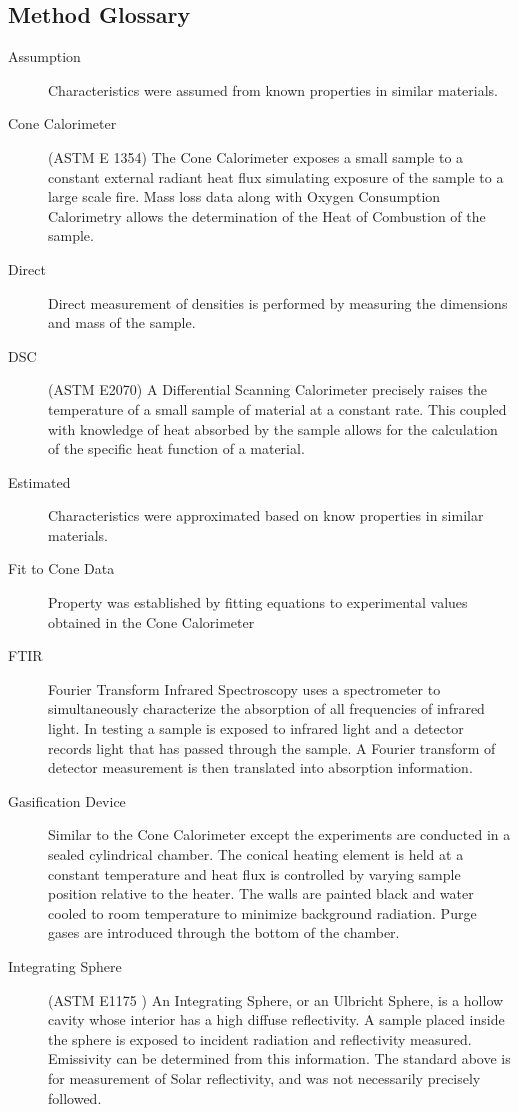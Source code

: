 \subsection{Method Glossary}
\begin{description}
\item[Assumption]  Characteristics were assumed from known properties in similar materials.
\item[Cone Calorimeter] (ASTM E 1354) The Cone Calorimeter exposes a small sample to a constant external radiant heat flux simulating exposure of the sample to a large scale fire. Mass loss data along with Oxygen Consumption Calorimetry allows the determination of the Heat of Combustion of the sample. 
\item[Direct]  Direct measurement of densities is performed by measuring the dimensions and mass of the sample.
\item[DSC] (ASTM E2070) A Differential Scanning Calorimeter precisely raises the temperature of a small sample of material at a constant rate. This coupled with knowledge of heat absorbed by the sample allows for the calculation of the specific heat function of a material.
\item[Estimated] Characteristics were approximated based on know properties in similar materials.
\item[Fit to Cone Data] Property was established by fitting  equations to experimental values obtained in the Cone Calorimeter
\item[FTIR] Fourier Transform Infrared Spectroscopy uses a spectrometer to simultaneously characterize the absorption of all frequencies of infrared light. In testing a sample is exposed to infrared light and a detector records light that has passed through the sample. A Fourier transform of detector measurement is then translated into absorption information.
\item[Gasification Device] Similar to the Cone Calorimeter except the experiments are conducted in a sealed cylindrical chamber. The conical heating element is held at a constant temperature and heat flux is controlled by varying sample position relative to the heater. The walls are painted black and water cooled to room temperature to minimize background radiation. Purge gases are introduced through the bottom of the chamber.
\item[Integrating Sphere] (ASTM E1175 ) An Integrating Sphere, or an Ulbricht Sphere, is a hollow cavity whose interior has a high diffuse reflectivity. A sample placed inside the sphere is exposed to incident radiation and reflectivity measured. Emissivity can be determined from this information. The standard above is for measurement of Solar reflectivity, and was not necessarily precisely followed.

\end{description}
